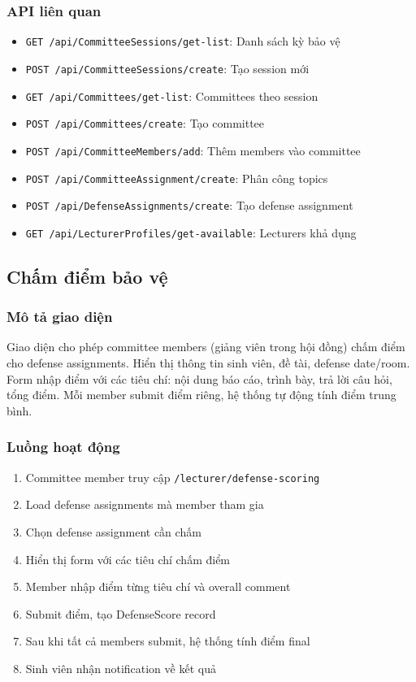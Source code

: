\documentclass[conference,a4paper]{IEEEtran}
\begin{document}
\subsubsection{API liên quan}
\begin{itemize}
  \item \texttt{GET /api/CommitteeSessions/get-list}: Danh sách kỳ bảo vệ
  \item \texttt{POST /api/CommitteeSessions/create}: Tạo session mới
  \item \texttt{GET /api/Committees/get-list}: Committees theo session
  \item \texttt{POST /api/Committees/create}: Tạo committee
  \item \texttt{POST /api/CommitteeMembers/add}: Thêm members vào committee
  \item \texttt{POST /api/CommitteeAssignment/create}: Phân công topics
  \item \texttt{POST /api/DefenseAssignments/create}: Tạo defense assignment
  \item \texttt{GET /api/LecturerProfiles/get-available}: Lecturers khả dụng
\end{itemize}

\subsection{Chấm điểm bảo vệ}
\subsubsection{Mô tả giao diện}
Giao diện cho phép committee members (giảng viên trong hội đồng) chấm điểm cho defense assignments. Hiển thị thông tin sinh viên, đề tài, defense date/room. Form nhập điểm với các tiêu chí: nội dung báo cáo, trình bày, trả lời câu hỏi, tổng điểm. Mỗi member submit điểm riêng, hệ thống tự động tính điểm trung bình.

\subsubsection{Luồng hoạt động}
\begin{enumerate}
  \item Committee member truy cập \texttt{/lecturer/defense-scoring}
  \item Load defense assignments mà member tham gia
  \item Chọn defense assignment cần chấm
  \item Hiển thị form với các tiêu chí chấm điểm
  \item Member nhập điểm từng tiêu chí và overall comment
  \item Submit điểm, tạo DefenseScore record
  \item Sau khi tất cả members submit, hệ thống tính điểm final
  \item Sinh viên nhận notification về kết quả
\end{enumerate}
\end{document}
